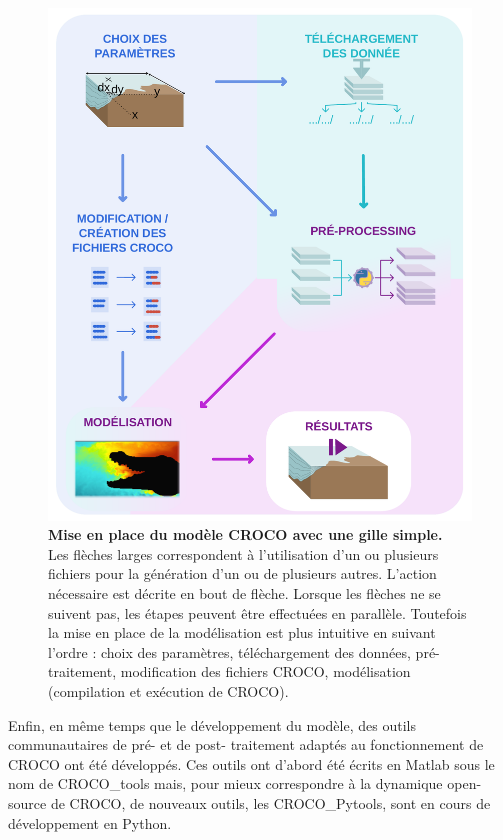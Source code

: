 \documentclass[10pt,a4paper,titlepage]{article}
\begin{document}
\begin{figure}[h!]
    \centering
    \includegraphics[scale=0.35]{../images/workflow/mise_en_place_generale_croco.pdf}
    \caption{
        \textbf{Mise en place du modèle CROCO avec une gille simple.}
        \\Les flèches larges correspondent à l'utilisation d'un ou plusieurs fichiers pour la génération d'un ou de plusieurs autres.
        L'action nécessaire est décrite en bout de flèche.
        Lorsque les flèches ne se suivent pas, les étapes peuvent être effectuées en parallèle.
        Toutefois la mise en place de la modélisation est plus intuitive en suivant l'ordre : {\color{paramColor}choix des paramètres}, {\color{dataColor} téléchargement des données}, {\color{workColor} pré-traitement}, {\color{paramColor} modification des fichiers CROCO}, {\color{workColor} modélisation (compilation et exécution de CROCO)}.
    }
    \label{fig:workflow_simple}
\end{figure}

Enfin, en même temps que le développement du modèle, des outils communautaires de pré- et de post- traitement adaptés au fonctionnement de CROCO ont été développés.
Ces outils ont d'abord été écrits en Matlab sous le nom de CROCO\_tools mais, pour mieux correspondre à la dynamique open-source de CROCO, de nouveaux outils, les CROCO\_Pytools, sont en cours de développement en Python.
\end{document}
